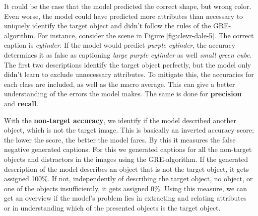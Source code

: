 It could be the case that the model predicted the correct shape, but wrong color.
Even worse, the model could have predicted more attributes than necessary to uniquely identify the target object and didn't follow the rules of the GRE-algorithm.
For instance, consider the scene in Figure \ref{fig:clevr-dale-5}.
The correct caption is \emph{cylinder}.
If the model would predict \emph{purple cylinder}, the accuracy determines it as false as captioning \emph{large purple cylinder} as well \emph{small green cube}.
The first two descriptions identify the target object perfectly, but the model only didn't learn to exclude unnecessary attributes.
To mitigate this, the accuracies for each class are included, as well as the macro average.
This can give a better understanding of the errors the model makes.
The same is done for \textbf{precision} and \textbf{recall}.

With the \textbf{non-target accuracy}, we identify if the model described another object, which is not the target image.
This is basically an inverted accuracy score; the lower the score, the better the model fares.
By this it measures the false negative generated captions.
For this we generated captions for all the non-target objects and distractors in the images using the GRE-algorithm.
If the generated description of the model describes an object that is not the target object, it gets assigned 100\%.
If not, independently of describing the target object, no object, or one of the objects insufficiently, it gets assigned 0\%.
Using this measure, we can get an overview if the model's problem lies in extracting and relating attributes or in understanding which of the presented objects is the target object.

